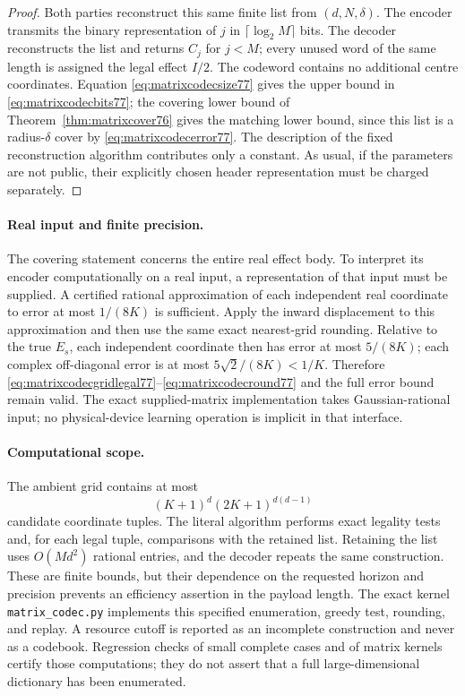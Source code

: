 \begin{proof}
Both parties reconstruct this same finite list from $(d,N,\delta)$.
The encoder transmits the binary representation of $j$ in
$\lceil\log_2 M\rceil$ bits.  The decoder reconstructs the list and
returns $C_j$ for $j<M$; every unused word of the same length is
assigned the legal effect $I/2$.
The codeword contains no additional centre coordinates.  Equation
\eqref{eq:matrixcodecsize77} gives the upper bound in
\eqref{eq:matrixcodecbits77}; the covering lower bound of
Theorem~\ref{thm:matrixcover76} gives the matching lower bound,
since this list is a radius-$\delta$ cover by
\eqref{eq:matrixcodecerror77}.  The description of the fixed
reconstruction algorithm contributes only a constant.  As usual,
if the parameters are not public, their explicitly chosen header
representation must be charged separately.
\end{proof}

\paragraph{Real input and finite precision.}
The covering statement concerns the entire real effect body.  To
interpret its encoder computationally on a real input, a representation
of that input must be supplied.  A certified rational approximation
of each independent real coordinate to error at most $1/(8K)$ is
sufficient.  Apply the inward displacement to this approximation
and then use the same exact nearest-grid rounding.  Relative to the
true $E_s$, each independent coordinate then has error at most
$5/(8K)$; each complex off-diagonal error is at most
$5\sqrt2/(8K)<1/K$.  Therefore
\eqref{eq:matrixcodecgridlegal77}--\eqref{eq:matrixcodecround77}
and the full error bound remain valid.  The exact supplied-matrix
implementation takes Gaussian-rational input; no physical-device
learning operation is implicit in that interface.

\paragraph{Computational scope.}
The ambient grid contains at most
\begin{equation}\label{eq:matrixcodecwork77}
 (K+1)^d(2K+1)^{d(d-1)}
\end{equation}
candidate coordinate tuples.  The literal algorithm performs exact
legality tests and, for each legal tuple, comparisons with the retained
list.  Retaining the list uses $O(Md^2)$ rational entries, and the
decoder repeats the same construction.  These are finite bounds,
but their dependence on the requested horizon and precision prevents
an efficiency assertion in the payload length.  The exact kernel
\texttt{matrix\_codec.py} implements this specified enumeration,
greedy test, rounding, and replay.  A resource cutoff is reported as
an incomplete construction and never as a codebook.  Regression
checks of small complete cases and of matrix kernels certify those
computations; they do not assert that a full large-dimensional
dictionary has been enumerated.

